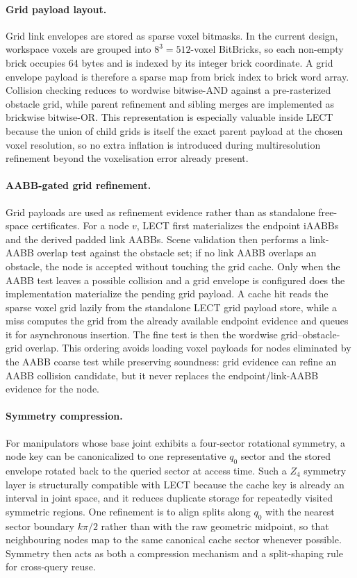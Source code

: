 \documentclass[journal]{IEEEtran}
\newcommand{\iAABB}{\ensuremath{\mathrm{iAABB}}}
\begin{document}
\paragraph{Grid payload layout.}
Grid link envelopes are stored as sparse voxel bitmasks. In the
current design, workspace voxels are grouped into $8^3=512$-voxel BitBricks, so
each non-empty brick occupies 64 bytes and is indexed by its integer brick
coordinate. A grid envelope payload is therefore a sparse map from brick index
to brick word array. Collision checking reduces to wordwise bitwise-AND against
a pre-rasterized obstacle grid, while parent refinement and sibling merges are
implemented as brickwise bitwise-OR. This representation is especially valuable
inside LECT because the union of child grids is itself the exact parent payload
at the chosen voxel resolution, so no extra inflation is introduced during
multiresolution refinement beyond the voxelisation error already present.

\paragraph{AABB-gated grid refinement.}
Grid payloads are used as refinement evidence rather than as standalone
free-space certificates. For a node $v$, LECT first materializes the endpoint
\iAABB{}s and the derived padded link AABBs. Scene validation then performs a
link-AABB overlap test against the obstacle set; if no link AABB overlaps an
obstacle, the node is accepted without touching the grid cache. Only when the
AABB test leaves a possible collision and a grid envelope is configured does
the implementation materialize the pending grid payload. A cache hit reads the
sparse voxel grid lazily from the standalone LECT grid payload store, while a
miss computes the grid from the already available endpoint evidence and queues
it for asynchronous insertion. The fine test is then the wordwise
grid--obstacle-grid overlap. This
ordering avoids loading voxel payloads for nodes eliminated by the AABB coarse
test while preserving soundness: grid evidence can refine an AABB collision
candidate, but it never replaces the endpoint/link-AABB evidence for the node.

\paragraph{Symmetry compression.}
For manipulators whose base joint exhibits a four-sector rotational symmetry, a
node key can be canonicalized to one representative $q_0$ sector and the stored
envelope rotated back to the queried sector at access time. Such a $Z_4$
symmetry layer is structurally compatible with LECT because the cache key is
already an interval in joint space, and it reduces duplicate storage for
repeatedly visited symmetric regions. One refinement is to align splits
along $q_0$ with the nearest sector boundary $k\pi/2$ rather than with the raw
geometric midpoint, so that neighbouring nodes map to the same canonical cache
sector whenever possible. Symmetry then acts as both a compression mechanism
and a split-shaping rule for cross-query reuse.
\end{document}
